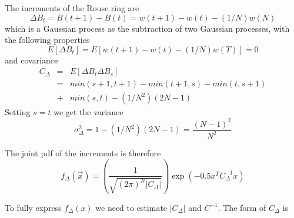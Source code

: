 \documentclass{report}
\begin{document}
The increments of the Rouse ring are
\begin{equation*}
\Delta B_t= B(t+1)-B(t)=w(t+1)-w(t)-(1/N)w(N)
\end{equation*}
which is a Gaussian process as the subtraction of two Gaussian processes, with the following properties
\begin{equation*}
E[\Delta B_t]=E[w(t+1)-w(t)-(1/N)w(T)]=0
\end{equation*}
and covariance
 \begin{eqnarray*}
 C_{\Delta} & = & E[\Delta B_t \Delta B_s]\\
  & = & min(s+1,t+1)-min(t+1,s)-min(t,s+1)\\
  &+ & min(s,t)-(1/N^2)(2N-1)
 \end{eqnarray*}
Setting $s=t $ we get the variance 
\begin{equation*}
\sigma^2_{\Delta}=1-(1/N^2)(2N-1)=\frac{(N-1)^2}{N^2}
\end{equation*}

The joint pdf of the increments is therefore 
\begin{equation*}
f_\Delta(\vec{x}) = \left(\frac{1}{\sqrt{(2\pi)^N |C_\Delta|}}\right)\exp(-0.5x^TC_\Delta^{-1}x)
\end{equation*}

To fully express $f_\Delta(x)$ we need to estimate $|C_\Delta|$ and $C^{-1}$. The form of $C_\Delta$ is 
\end{document}
